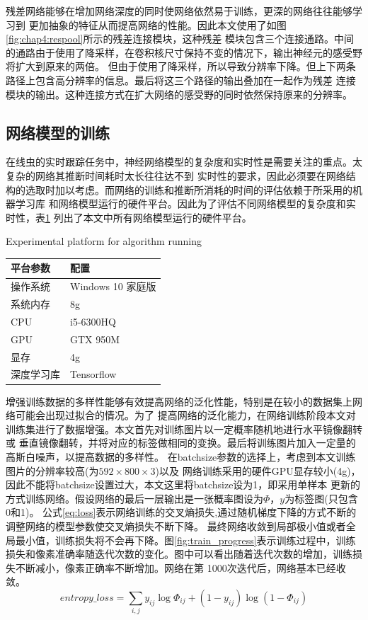 	残差网络\cite{he2016deep}能够在增加网络深度的同时使网络依然易于训练，更深的网络往往能够学习到
	更加抽象的特征从而提高网络的性能。因此本文使用了如图\ref{fig:chap4:respool}所示的残差连接模块\cite{chu2017multi}，这种残差
	模块包含三个连接通路。中间的通路由于使用了降采样，在卷积核尺寸保持不变的情况下，输出神经元的感受野将扩大到原来的两倍。
	但由于使用了降采样，所以导致分辨率下降。但上下两条路径上包含高分辨率的信息。最后将这三个路径的输出叠加在一起作为残差
	连接模块的输出。这种连接方式在扩大网络的感受野的同时依然保持原来的分辨率。
	
\subsection{网络模型的训练}
	在线虫的实时跟踪任务中，神经网络模型的复杂度和实时性是需要关注的重点。太复杂的网络其推断时间耗时太长往往达不到
	实时性的要求，因此必须要在网络结构的选取时加以考虑。而网络的训练和推断所消耗的时间的评估依赖于所采用的机器学习库
	和网络模型运行的硬件平台。因此为了评估不同网络模型的复杂度和实时性，表\ref{tab:hardwareconfig}
	列出了本文中所有网络模型运行的硬件平台。
	\begin{table}[!hpb]
	\centering
    {Experimental platform for algorithm running}
	\label{tab:hardwareconfig}
	\begin{tabular}{p{80pt}p{100pt}}
	\toprule
	平台参数 & 配置 \\
	\midrule
	操作系统 & Windows 10 家庭版\\
	系统内存 & 8g \\
	CPU & i5-6300HQ \\
	GPU & GTX 950M \\
	显存 & 4g \\
	深度学习库 & Tensorflow \\
	\bottomrule
	\end{tabular}
	\end{table}
	
	增强训练数据的多样性能够有效提高网络的泛化性能，特别是在较小的数据集上网络可能会出现过拟合的情况。为了
	提高网络的泛化能力，在网络训练阶段本文对训练集进行了数据增强。本文首先对训练图片以一定概率随机地进行水平镜像翻转或
	垂直镜像翻转，并将对应的标签做相同的变换。最后将训练图片加入一定量的高斯白噪声，以提高数据的多样性。
	在batchsize参数的选择上，考虑到本文训练图片的分辨率较高(为$592\times800\times3$)以及
	网络训练采用的硬件GPU显存较小(4g)，因此不能将batchsize设置过大，本文这里将batchsize设为1，即采用单样本
	更新的方式训练网络。假设网络的最后一层输出是一张概率图设为$\Phi$，$y$为标签图(只包含0和1)。
	公式\ref{eq:loss}表示网络训练的交叉熵损失,通过随机梯度下降的方式不断的调整网络的模型参数使交叉熵损失不断下降。
	最终网络收敛到局部极小值或者全局最小值，训练损失将不会再下降。图\ref{fig:train_progress}表示训练过程中，训练
	损失和像素准确率随迭代次数的变化。图中可以看出随着迭代次数的增加，训练损失不断减小，像素正确率不断增加。网络在第
	1000次迭代后，网络基本已经收敛。
	\begin{equation}
		entropy\_loss = \sum_{i,j}y_{ij}\log \Phi_{ij} + (1-y_{ij})\log (1-\Phi_{ij}) \label{eq:loss}
	\end{equation}
	
